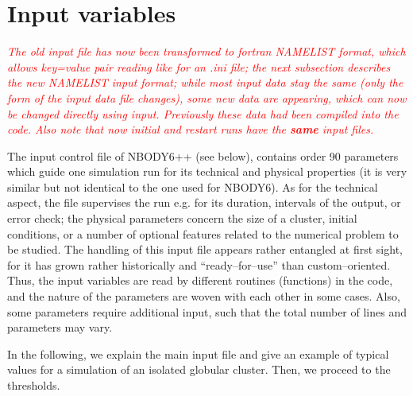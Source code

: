 
\section{Input variables} \label{ch:inputvar}

\textcolor{red}{
{\it The old input file has now been transformed to fortran NAMELIST format, which allows key=value pair reading like for an .ini file; the next subsection describes the new NAMELIST input format; while most input data stay the same (only the form of the input data file changes), some new data are appearing, which can now be changed directly using input. Previously these data had been compiled into the code. Also note that now initial and restart runs have the {\bf same} input files.}}

The input control file of NBODY6++ (see below), contains
order 90 parameters which guide one simulation run for
its technical and physical properties
(it is very similar but not identical to the one used for NBODY6).
As for the technical aspect, the file supervises the run e.g.
for its duration, intervals of the output, or error check;
the physical parameters concern the size of a cluster,
initial conditions, or a number of optional features 
related to the numerical problem to be studied.
The handling of this input file appears rather entangled
at first sight, for it has grown rather historically and
``ready--for--use'' than custom--oriented.
Thus, the input variables are read by different routines
(functions) in the code, and the nature of the parameters
are woven with each other in some cases.
Also, some parameters require additional input, such that the
total number of lines and parameters may vary.

In the following, we explain the main input file and give an
example of typical values for a simulation of an isolated
globular cluster.
Then, we proceed to the thresholds.\\

\noindent

